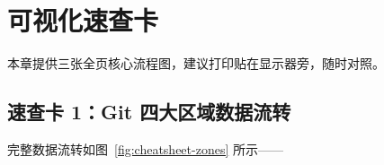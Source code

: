 \documentclass[12pt,a4paper,openany]{ctexbook}
\begin{document}
\chapter*{可视化速查卡}

本章提供三张全页核心流程图，建议打印贴在显示器旁，随时对照。

\section{速查卡 1：Git 四大区域数据流转}

完整数据流转如图~\ref{fig:cheatsheet-zones} 所示——
\end{document}
